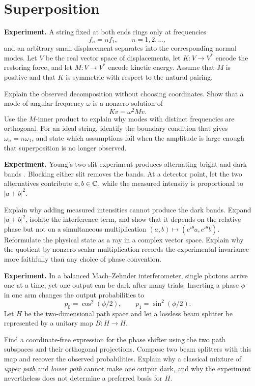 \section{Superposition}

\begin{exercise}
\textbf{Experiment.}
A string fixed at both ends rings only at frequencies
\[
        f_n=nf_1,\qquad n=1,2,\ldots,
\]
and an arbitrary small displacement separates into the corresponding normal
modes.  Let \(V\) be the real vector space of displacements, let
\(K:V\to V^*\) encode the restoring force, and let
\(M:V\to V^*\) encode kinetic energy.  Assume that \(M\) is positive and that
\(K\) is symmetric with respect to the natural pairing.

Explain the observed decomposition without choosing coordinates.  Show that a
mode of angular frequency \(\omega\) is a nonzero solution of
\[
        Kv=\omega^2Mv.
\]
Use the \(M\)-inner product to explain why modes with distinct frequencies are
orthogonal.  For an ideal string, identify the boundary condition that gives
\(\omega_n=n\omega_1\), and state which assumptions fail when the amplitude is
large enough that superposition is no longer observed.
\end{exercise}

\begin{exercise}
\textbf{Experiment.}
Young's two-slit experiment produces alternating bright and dark bands
\cite{young}.  Blocking either slit removes the bands.  At a detector point,
let the two alternatives contribute \(a,b\in\mathbb C\), while the measured intensity
is proportional to \(|a+b|^2\).

Explain why adding measured intensities cannot produce the dark bands.
Expand \(|a+b|^2\), isolate the interference term, and show that it depends on
the relative phase but not on a simultaneous multiplication
\((a,b)\mapsto(e^{i\theta}a,e^{i\theta}b)\).  Reformulate the physical state as
a ray in a complex vector space.  Explain why the quotient by nonzero scalar
multiplication records the experimental invariance more faithfully than any
choice of phase convention.
\end{exercise}

\begin{exercise}
\textbf{Experiment.}
In a balanced Mach--Zehnder interferometer, single photons arrive one at a
time, yet one output can be dark after many trials.  Inserting a phase
\(\phi\) in one arm changes the output probabilities to
\[
        p_0=\cos^2(\phi/2),\qquad p_1=\sin^2(\phi/2).
\]
Let \(H\) be the two-dimensional path space and let a lossless beam splitter
be represented by a unitary map \(B:H\to H\).

Find a coordinate-free expression for the phase shifter using the two path
subspaces and their orthogonal projections.  Compose two beam splitters with
this map and recover the observed probabilities.  Explain why a classical
mixture of \emph{upper path} and \emph{lower path} cannot make one output
dark, and why the experiment nevertheless does not determine a preferred
basis for \(H\).
\end{exercise}

